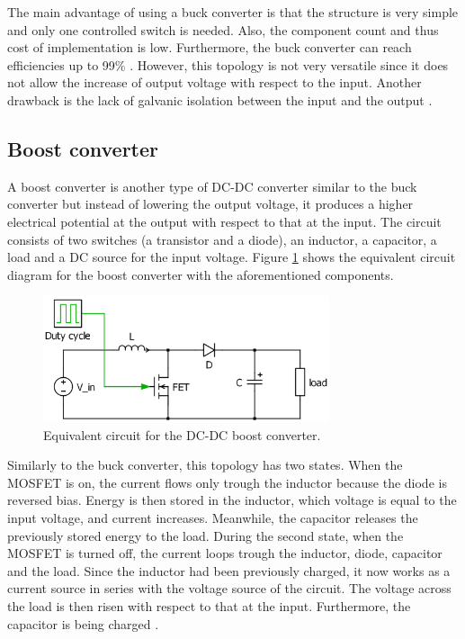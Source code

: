 The main advantage of using a buck converter is that the structure is very simple and only one controlled  switch is needed. Also, the component count and thus cost of implementation is low. Furthermore, the buck converter can reach efficiencies up to 99\% \cite{Efficiencybuck}. However, this topology is not very versatile since it does not allow the increase of output voltage with respect to the input. Another drawback is the lack of galvanic isolation between the input and the output \cite{advantagebuckboost} .
\subsection{Boost converter\label{Boost-C}}

A boost converter is another type of DC-DC converter similar to the buck converter but instead of lowering the output voltage, it produces a higher electrical potential at the output with respect to that at the input. 
The circuit consists of two switches (a transistor and a diode), an inductor, a capacitor, a load and a DC source for the input voltage. Figure \ref{Boost-converter} shows the equivalent circuit diagram for the boost converter with the aforementioned components. %

\begin{figure}[H]
	\begin{center}
		\includegraphics[width=0.75\textwidth]{../Pictures/Boost-converter}
		\caption{Equivalent circuit for the DC-DC boost converter.}
		\label{Boost-converter}
	\end{center}	
\end{figure}

\vspace{1cm}
Similarly to the buck converter, this topology has two states. When the MOSFET is on, the current flows only trough the inductor because the diode  is reversed bias. Energy is then stored in the inductor, which voltage is equal to the input voltage, and current increases. Meanwhile, the capacitor releases the previously stored energy to the load.
During the second state, when the MOSFET is turned off, the current loops trough the inductor, diode, capacitor and the load. Since the inductor had been previously charged, it now works as a current source in series with the voltage source of the circuit. The voltage across the load is then risen with respect to that at the input. Furthermore, the capacitor is being charged \cite{schematicbuckandboost}.

